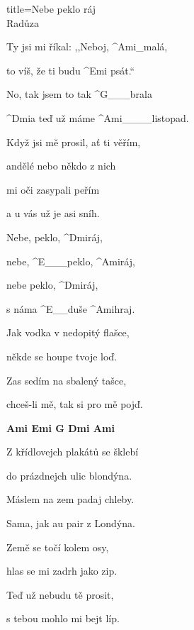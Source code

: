 \begin{song}{title=\predtitle\centering Nebe peklo ráj \\\large Radůza \vspace*{-0.3cm}}  %
\begin{centerjustified}
\nejnejvetsi

\begin{varwidth}[t]{0.48\textwidth}\setlength{\parindent}{\pindent}  %
\sloka 
	Ty jsi mi říkal: ,,Neboj, ^{Ami{\color{white}\_}}malá,

	to víš, že ti budu ^{Emi\,\,}psát.``

	No, tak jsem to tak ^{G{\color{white}\_\_\_}}brala

	^{Dmi}a teď už máme ^{Ami{\color{white}\_\_\_\_}}listopad.

\sloka
	Když jsi mě prosil, ať ti věřím,

	andělé nebo někdo z nich

	mi oči zasypali peřím
	
	a u vás už je asi sníh.

	Nebe, peklo, ^{Dmi}ráj,

	nebe, ^{E{\color{white}\_\_\_}}peklo, ^{Ami}ráj,

   	nebe peklo, ^{Dmi}ráj,

	s náma ^{E{\color{white}\_\_}}duše ^{Ami}hraj.


\sloka
	Jak vodka v nedopitý flašce,

	někde se houpe tvoje loď.

	Zas sedím na sbalený tašce,

	chceš-li mě, tak si pro mě pojď.

    

\end{varwidth}\begin{varwidth}[t]{0.5\textwidth}\setlength{\parindent}{\pindent}
\vspace*{0.465cm}

\phantom{.}

\textbf{Ami  Emi  G  Dmi  Ami}


\sloka
	Z křídlovejch plakátů se šklebí
	
	do prázdnejch ulic blondýna.
	
	Máslem na zem padaj chleby.
	
	Sama, jak au pair z Londýna.

\sloka
	Země se točí kolem osy,
	
	hlas se mi zadrh jako zip.
	
	Teď už nebudu tě prosit,
	
	s tebou mohlo mi bejt líp.


\end{varwidth}

\end{centerjustified}
\setcounter{Slokočet}{0}
\end{song}
